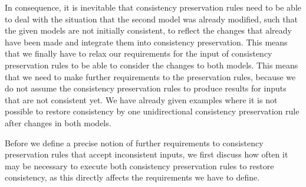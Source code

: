 In consequence, it is inevitable that consistency preservation rules need to be able to deal with the situation that the second model was already modified, such that the given models are not initially consistent, to reflect the changes that already have been made and integrate them into consistency preservation.
This means that we finally have to relax our requirements for the input of consistency preservation rules to be able to consider the changes to both models.
This means that we need to make further requirements to the preservation rules, because we do not assume the consistency preservation rules to produce results for inputs that are not consistent yet.
We have already given examples where it is not possible to restore consistency by one unidirectional consistency preservation rule after changes in both models.

Before we define a precise notion of further requirements to consistency preservation rules that accept inconsistent inputs, we first discuss how often it may be necessary to execute both consistency preservation rules to restore consistency, as this directly affects the requirements we have to define.




